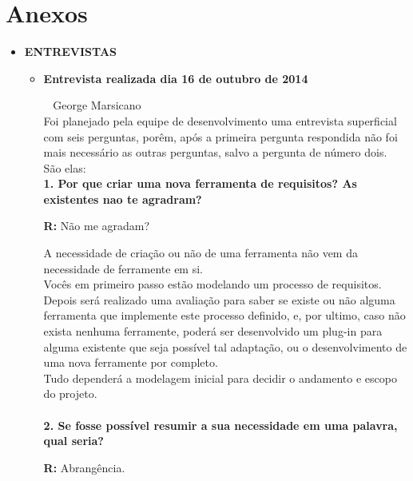 
\appendix
\chapter*{Anexos}
\begin{itemize} \item \textbf{ENTREVISTAS}
\begin{itemize}
	\item \textbf{Entrevista realizada dia 16 de outubro de 2014}

		\cliente~ George Marsicano\\
		Foi planejado pela equipe de desenvolvimento uma entrevista superficial com seis perguntas, porêm, após a primeira pergunta respondida não foi mais necessário as outras perguntas, salvo a pergunta de número dois.\\
		São elas:\\
		

		\textbf{1. Por que criar uma nova ferramenta de requisitos? As existentes nao te agradram?}
	
		\textbf{R:} Não me agradam?

		A necessidade de criação ou não de uma ferramenta não vem da necessidade de ferramente em si.
		\\
		Vocês em primeiro passo estão modelando um processo de requisitos. Depois será realizado uma avaliação para saber se existe ou não alguma ferramenta que implemente este processo definido, e, por ultimo, caso não exista nenhuma ferramente, poderá ser desenvolvido um plug-in para alguma existente que seja possível tal adaptação, ou o desenvolvimento de uma nova ferramente por completo.
		\\
		Tudo dependerá a modelagem inicial para decidir o andamento e escopo do projeto.
		\\
		\\
		\textbf{2. Se fosse possível resumir a sua necessidade em uma palavra, qual seria?}

		\textbf{R:} Abrangência.
\end{itemize}
\end{itemize}

